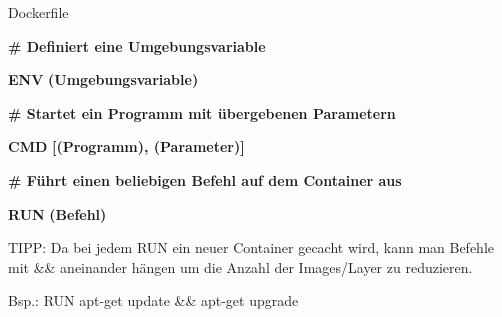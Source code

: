 \documentclass[final]{beamer}
\newlength{\onecolwid}
\begin{document}
\begin{frame}
\begin{columns}[t]
\begin{column}{\onecolwid}
\begin{block}{Dockerfile}
\vspace{1cm}
\par \textcolor{docker-green}{\textbf{\# Definiert eine Umgebungsvariable}}
\par \textcolor{docker-pu}{\textbf{ENV}} \textcolor{docker-red}{\textbf{(Umgebungsvariable)}}

\vspace{1cm}
\par \textcolor{docker-green}{\textbf{\# Startet ein Programm mit übergebenen Parametern}}
\par \textcolor{docker-pu}{\textbf{CMD}} \textcolor{docker-red}{\textbf{[(Programm), (Parameter)]}}

\vspace{1cm}
\par \textcolor{docker-green}{\textbf{\# Führt einen beliebigen Befehl auf dem Container aus}}
\par \textcolor{docker-pu}{\textbf{RUN}} \textcolor{docker-red}{\textbf{(Befehl)}}

\begin{small}
\vspace{1cm}
\par TIPP: Da bei jedem RUN ein neuer Container gecacht wird, kann man Befehle mit \&\& aneinander hängen um die Anzahl der Images/Layer zu reduzieren.

\vspace{1cm}
\par Bsp.: RUN apt-get update \&\& apt-get upgrade
	
\end{small}



\vspace{3cm}


\end{block}
\end{column}
\end{columns}
\end{frame}
\end{document}
